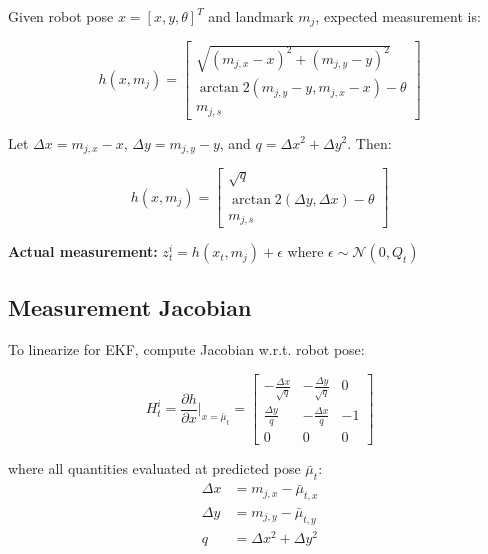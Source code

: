 Given robot pose $x = [x, y, \theta]^T$ and landmark $m_j$, expected measurement is:

\begin{equation}
\boxed{
h(x, m_j) = \begin{bmatrix} 
\sqrt{(m_{j,x} - x)^2 + (m_{j,y} - y)^2} \\[5pt]
\arctan2(m_{j,y} - y, m_{j,x} - x) - \theta \\[5pt]
m_{j,s} 
\end{bmatrix}
}
\label{eq:measurement_function}
\end{equation}

Let $\Delta x = m_{j,x} - x$, $\Delta y = m_{j,y} - y$, and $q = \Delta x^2 + \Delta y^2$. Then:

\begin{equation}
h(x, m_j) = \begin{bmatrix} \sqrt{q} \\ \arctan2(\Delta y, \Delta x) - \theta \\ m_{j,s} \end{bmatrix}
\end{equation}

\textbf{Actual measurement:} $z_t^i = h(x_t, m_j) + \epsilon$ where $\epsilon \sim \mathcal{N}(0, Q_t)$

\subsection{Measurement Jacobian}

To linearize for EKF, compute Jacobian w.r.t. robot pose:

\begin{equation}
H_t^i = \frac{\partial h}{\partial x}\bigg|_{x=\bar{\mu}_t} = 
\boxed{
\begin{bmatrix} 
-\frac{\Delta x}{\sqrt{q}} & -\frac{\Delta y}{\sqrt{q}} & 0 \\[5pt]
\frac{\Delta y}{q} & -\frac{\Delta x}{q} & -1 \\[5pt]
0 & 0 & 0 
\end{bmatrix}
}
\label{eq:measurement_jacobian}
\end{equation}

where all quantities evaluated at predicted pose $\bar{\mu}_t$:
\begin{align}
\Delta x &= m_{j,x} - \bar{\mu}_{t,x} \\
\Delta y &= m_{j,y} - \bar{\mu}_{t,y} \\
q &= \Delta x^2 + \Delta y^2
\end{align}

